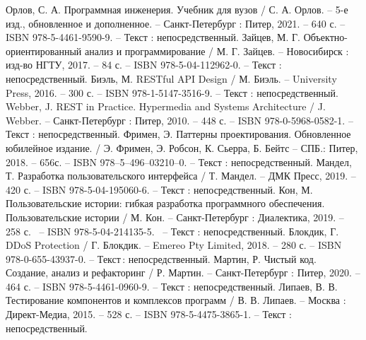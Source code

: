 \begin{thebibliography}{51}
	 Орлов, С. А. Программная инженерия. Учебник для вузов / С. А. Орлов. – 5-е изд., обновленное и дополненное. – Санкт-Петербург : Питер, 2021. – 640 с. – ISBN 978-5-4461-9590-9. – Текст : непосредственный.
	 Зайцев, М. Г. Объектно-ориентированный анализ и программирование / М. Г. Зайцев. – Новосибирск : изд-во НГТУ, 2017. – 84 с. – ISBN 978-5-04-112962-0. – Текст : непосредственный.
	  Биэль, М. RESTful API Design / М. Биэль. – University Press, 2016. – 300 с. – ISBN 978-1-5147-3516-9. – Текст : непосредственный.
		Webber, J. REST in Practice. Hypermedia and Systems Architecture / J. Webber. – Санкт-Петербург : Питер, 2010. – 448 с. – ISBN 978-0-5968-0582-1. – Текст : непосредственный.
	 Фримен, Э. Паттерны проектирования. Обновленное юбилейное издание. / Э. Фримен, Э. Робсон, К. Сьерра, Б. Бейтс – СПБ.: Питер, 2018. – 656с. – ISBN 978–5–496–03210–0. – Текст : непосредственный.
	 Мандел, Т. Разработка пользовательского интерфейса / Т. Мандел. – ДМК Пресс, 2019. – 420 с. – ISBN 978-5-04-195060-6. – Текст : непосредственный.
	 Кон, М. Пользовательские истории: гибкая разработка программного обеспечения. Пользовательские истории / М. Кон. – Санкт-Петербург : Диалектика, 2019. – 258 с. ~– ISBN 978-5-04-214135-5. ~– Текст : непосредственный.
	 Блокдик, Г. DDoS Protection / Г. Блокдик. – Emereo Pty Limited, 2018. – 280 с. – ISBN 978-0-655-43937-0. – Текст : непосредственный.
	 Мартин, Р. Чистый код. Создание, анализ и рефакторинг / Р. Мартин. – Санкт-Петербург : Питер, 2020. – 464 с. – ISBN 978-5-4461-0960-9. – Текст : непосредственный.
	 Липаев, В. В. Тестирование компонентов и комплексов программ / В. В. Липаев. – Москва : Директ-Медиа, 2015. – 528 с. – ISBN 978-5-4475-3865-1. – Текст : непосредственный.
\end{thebibliography}
